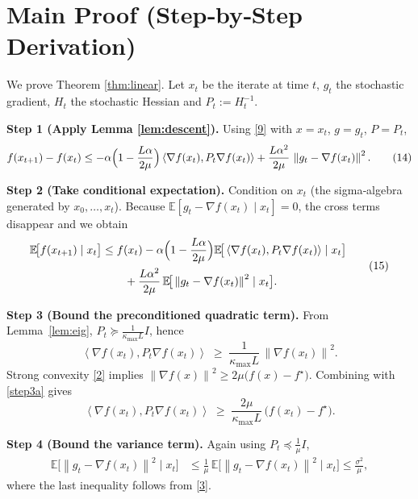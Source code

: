 \documentclass{article}
\newcommand{\E}{\mathbb{E}}
\newcommand{\norm}[1]{\left\lVert#1\right\rVert}
\newcommand{\ip}[2]{\left\langle #1,#2\right\rangle}
\newcommand{\grad}{\nabla}
\begin{document}
\section*{Main Proof (Step‑by‑Step Derivation)}
We prove Theorem \ref{thm:linear}. Let $x_t$ be the iterate at time $t$, $g_t$ the stochastic gradient, $H_t$ the stochastic Hessian and $P_t:=H_t^{-1}$.

\noindent\textbf{Step 1 (Apply Lemma \ref{lem:descent}).}  
Using \eqref{9} with $x=x_t$, $g=g_t$, $P=P_t$,
\[
f(x_{t+1})-f(x_t)\le
-\alpha\Bigl(1-\frac{L\alpha}{2\mu}\Bigr)\ip{\grad f(x_t)}{P_t\grad f(x_t)}
+\frac{L\alpha^{2}}{2\mu}\,\norm{g_t-\grad f(x_t)}^{2}.
\tag{14}\label{step1}
\]

\noindent\textbf{Step 2 (Take conditional expectation).}  
Condition on $x_t$ (the sigma‑algebra generated by $x_0,\dots,x_t$).  
Because $\E[g_t-\grad f(x_t)\mid x_t]=0$, the cross terms disappear and we obtain
\[
\begin{aligned}
\E\!\big[f(x_{t+1})\mid x_t\big]
&\le f(x_t)-\alpha\Bigl(1-\frac{L\alpha}{2\mu}\Bigr)
\E\!\big[\ip{\grad f(x_t)}{P_t\grad f(x_t)}\mid x_t\big] \\
&\qquad +\frac{L\alpha^{2}}{2\mu}\,
\E\!\big[\norm{g_t-\grad f(x_t)}^{2}\mid x_t\big].
\end{aligned}
\tag{15}\label{step2}
\]

\noindent\textbf{Step 3 (Bound the preconditioned quadratic term).}  
From Lemma~\ref{lem:eig}, $P_t\succeq \frac{1}{\kappa_{\max}L}I$, hence
\[
\ip{\grad f(x_t)}{P_t\grad f(x_t)}
\;\ge\;
\frac{1}{\kappa_{\max}L}\,\norm{\grad f(x_t)}^{2}.
\tag{16}\label{step3a}
\]
Strong convexity \eqref{2} implies $\norm{\grad f(x)}^{2}\ge 2\mu\bigl(f(x)-f^\star\bigr)$. Combining with \eqref{step3a} gives
\[
\ip{\grad f(x_t)}{P_t\grad f(x_t)}
\;\ge\;
\frac{2\mu}{\kappa_{\max}L}\,\bigl(f(x_t)-f^\star\bigr).
\tag{16}
\]

\noindent\textbf{Step 4 (Bound the variance term).}  
Again using $P_t\preceq \frac{1}{\mu}I$,
\[
\begin{aligned}
\E\!\big[\norm{g_t-\grad f(x_t)}^{2}\mid x_t\big]
&\le \frac{1}{\mu}\,
\E\!\big[\norm{g_t-\grad f(x_t)}^{2}\mid x_t\big]
\le \frac{\sigma^{2}}{\mu},
\end{aligned}
\tag{17}\label{step4}
\]
where the last inequality follows from \eqref{3}.
\end{document}
